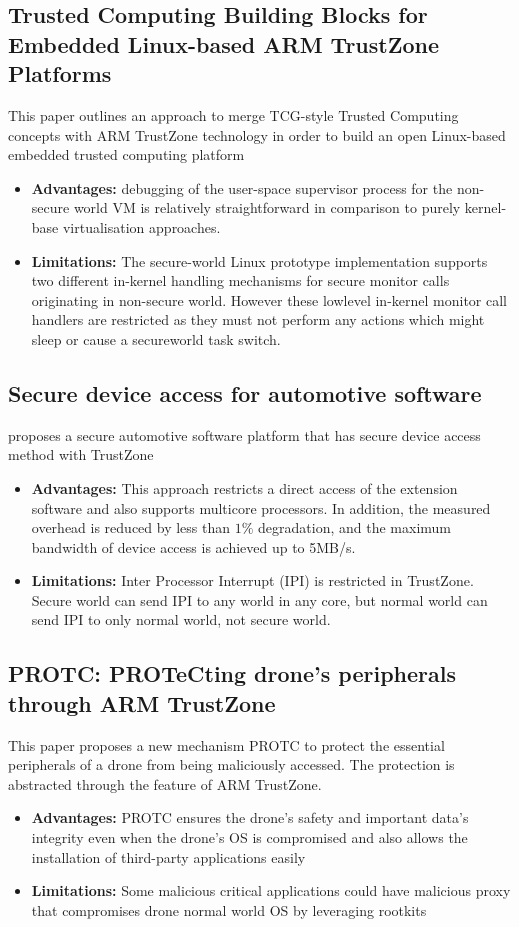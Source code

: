 \documentclass[conference]{IEEEtran}
\begin{document}
\subsection{Trusted Computing Building Blocks for Embedded Linux-based ARM TrustZone Platforms}
This paper outlines an approach to merge TCG-style Trusted Computing concepts with ARM TrustZone technology in order to build an open Linux-based embedded trusted computing platform
\begin{itemize}
    \item \textbf{Advantages:} debugging of the user-space supervisor process for the non-secure world VM is relatively straightforward in comparison to purely kernel-base virtualisation approaches.
    \item \textbf{Limitations:} The secure-world Linux prototype implementation supports two different in-kernel handling mechanisms for secure monitor calls originating in non-secure world. However these lowlevel in-kernel monitor call handlers are restricted as they must not perform any actions which might sleep or cause a secureworld task switch.
\end{itemize}


\subsection{Secure device access for automotive software}
proposes a secure automotive software platform that has secure device access method with TrustZone
\begin{itemize}
    \item \textbf{Advantages:} This approach restricts a direct access of the extension software and also supports multicore processors. In addition, the measured overhead is reduced by less than $1\%$ degradation, and the maximum bandwidth of device access is achieved up to 5MB/s.
    \item \textbf{Limitations:} Inter Processor Interrupt (IPI) is restricted in TrustZone. Secure world can send IPI to any world in any core, but normal world can send IPI to only normal world, not secure world.
\end{itemize}


\subsection{PROTC: PROTeCting drone’s peripherals through ARM TrustZone}
This paper proposes a new mechanism PROTC to protect the essential peripherals of a drone from being maliciously accessed. The protection is abstracted through the feature of ARM TrustZone.
\begin{itemize}
    \item \textbf{Advantages:} PROTC ensures the drone’s safety and important data’s integrity even when the drone’s OS is compromised and also allows the installation of third-party applications easily
    \item \textbf{Limitations:} Some malicious critical applications could have malicious proxy that compromises drone normal world OS by leveraging rootkits
\end{itemize}
\end{document}
